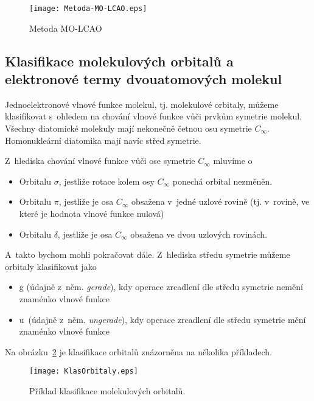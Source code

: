 \begin{figure} [htb]
\centering
\texttt{[image: Metoda-MO-LCAO.eps]}
\caption{Metoda MO-LCAO}
\label{obr:MOLCAO}
\end{figure}


\subsection{Klasifikace molekulových orbitalů a elektronové termy dvouatomových molekul}
 
Jednoelektronové vlnové funkce molekul, tj. molekulové orbitaly, můžeme klasifikovat s~ohledem na chování vlnové funkce vůči prvkům symetrie molekul. Všechny diatomické molekuly mají nekonečně četnou osu symetrie $C_\infty$. Homonukleární diatomika mají navíc střed symetrie.

Z~hlediska chování vlnové funkce vůči ose symetrie $C_\infty$ mluvíme o 

\begin{itemize}

\item Orbitalu $\sigma$, jestliže rotace kolem osy $C_\infty$ ponechá orbital nezměněn.

\item Orbitalu $\pi$, jestliže je osa $C_\infty$ obsažena v~jedné uzlové rovině (tj. v~rovině, ve které je hodnota vlnové funkce nulová)

\item Orbitalu $\delta$, jestliže je osa $C_\infty$ obsažena ve dvou uzlových rovinách. 

\end{itemize}

\noindent A~takto bychom mohli pokračovat dále. Z~hlediska středu symetrie můžeme orbitaly klasifikovat jako 

\begin{itemize}

\item g (údajně z~něm. \textit{gerade}), kdy operace zrcadlení dle středu symetrie nemění znaménko vlnové funkce

\item u~(údajně z~něm. \textit{ungerade}), kdy operace zrcadlení dle středu symetrie mění znaménko vlnové funkce 

\end{itemize}

Na obrázku~\ref{obr:KlasifikaceMO} je klasifikace orbitalů znázorněna na několika příkladech.

\begin{figure} [htb]
\centering
\texttt{[image: KlasOrbitaly.eps]}
\caption[Klasifikace MO]{Příklad klasifikace molekulových orbitalů.}
\label{obr:KlasifikaceMO}
\end{figure}
 

